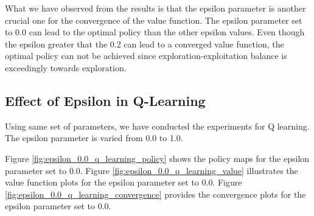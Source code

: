 \documentclass{assignment}
\begin{document}
What we have observed from the results is that the epsilon parameter is another crucial one for the convergence of the value function. The epsilon parameter set to 0.0 can lead to the optimal policy than the other epsilon values. Even though the epsilon greater that the 0.2 can lead to a converged value function, the optimal policy can not be achieved since exploration-exploitation balance is exceedingly towards exploration.

\subsection{Effect of Epsilon in Q-Learning}
Using same set of parameters, we have conducted the experiments for Q learning. The epsilon parameter is varied from 0.0 to 1.0.

Figure \ref{fig:epsilon_0.0_q_learning_policy} shows the policy maps for the epsilon parameter set to 0.0. Figure \ref{fig:epsilon_0.0_q_learning_value} illustrates the value function plots for the epsilon parameter set to 0.0. Figure \ref{fig:epsilon_0.0_q_learning_convergence} provides the convergence plots for the epsilon parameter set to 0.0.
\end{document}
